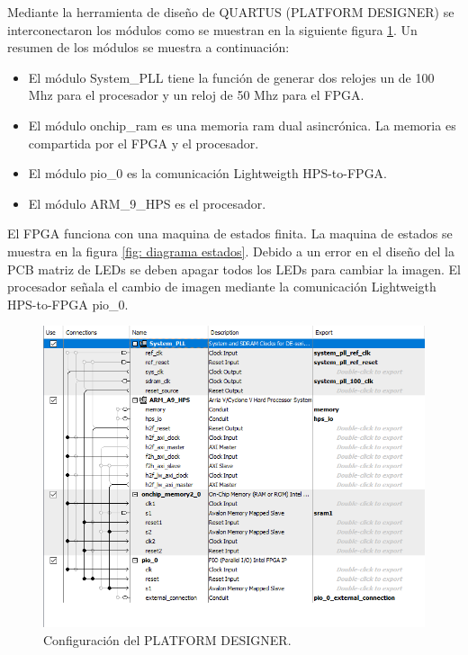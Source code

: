 Mediante la herramienta de diseño de QUARTUS (PLATFORM DESIGNER) se interconectaron los módulos como se muestran en la siguiente figura \ref{fig: platform}. Un resumen de los módulos se muestra a continuación:
\begin{itemize}
\item El módulo System\_PLL tiene la función de generar dos relojes un de 100 Mhz para el procesador y un reloj de 50 Mhz para el FPGA.
\item El módulo onchip\_ram es una memoria ram dual asincrónica. La memoria es compartida por el FPGA y el procesador. 
\item El módulo pio\_0 es la comunicación Lightweigth HPS-to-FPGA. 
\item El módulo ARM\_9\_HPS es el procesador. 
\end{itemize}

El FPGA funciona con una maquina de estados finita. La maquina de estados se muestra en la figura \ref{fig: diagrama estados}. Debido a un error en el diseño del la PCB matriz de LEDs se deben apagar todos los LEDs para cambiar la imagen. El procesador señala el cambio de imagen mediante la comunicación Lightweigth HPS-to-FPGA pio\_0.

 



\begin{figure}[htpb]
	\centering
	\includegraphics[scale=0.8]{Figures/platformdesigner.png} 
	\caption{Configuración del PLATFORM DESIGNER.}
	\label{fig: platform}
\end{figure}


